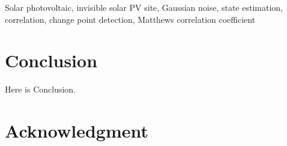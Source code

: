 \documentclass[conference]{IEEEtran}
\begin{document}
\begin{IEEEkeywords}
  Solar photovoltaic, invisible solar PV site, Gaussian noise, state estimation, correlation, change point detection, Matthews correlation coefficient
\end{IEEEkeywords}






\section{Conclusion}
Here is Conclusion.
\section*{Acknowledgment}


\end{document}
